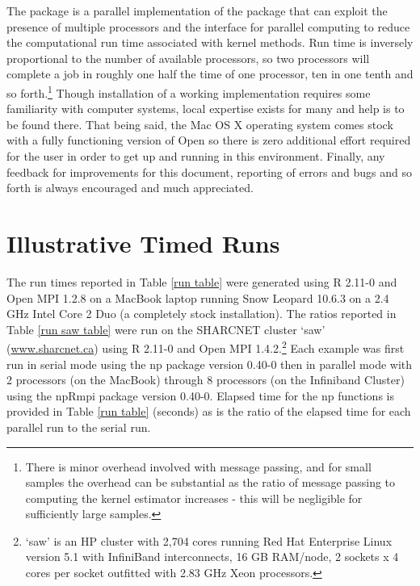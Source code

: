 \documentclass[nojss]{jss}
\begin{document}
The  package is a parallel implementation of the 
package that can exploit the presence of multiple processors and the
 interface for parallel computing to reduce the
computational run time associated with kernel methods. Run time is
inversely proportional to the number of available processors, so two
processors will complete a job in roughly one half the time of one
processor, ten in one tenth and so forth.\footnote{There is minor
  overhead involved with message passing, and for small samples the
  overhead can be substantial as the ratio of message passing to
  computing the kernel estimator increases - this will be negligible
  for sufficiently large samples.} Though installation of a working
 implementation requires some familiarity with computer
systems, local expertise exists for many and help is to be found
there. That being said, the Mac OS X operating system comes stock with
a fully functioning version of Open  so there is zero
additional effort required for the user in order to get up and running
in this environment. Finally, any feedback for improvements for this
document, reporting of errors and bugs and so forth is always
encouraged and much appreciated.



\appendix

\section{Illustrative Timed Runs}\label{sec run time}

The run times reported in Table \ref{run table} were generated using R
2.11-0 and Open MPI 1.2.8 on a MacBook laptop running Snow Leopard
10.6.3 on a 2.4 GHz Intel Core 2 Duo (a completely stock
installation). The ratios reported in Table \ref{run saw table} were
run on the SHARCNET cluster `saw' (\url{www.sharcnet.ca}) using R
2.11-0 and Open MPI 1.4.2.\footnote{`saw' is an HP cluster with 2,704
  cores running Red Hat Enterprise Linux version 5.1 with InfiniBand
  interconnects, 16 GB RAM/node, 2 sockets x 4 cores per socket
  outfitted with 2.83 GHz Xeon processors.}  Each example was first
run in serial mode using the np package version 0.40-0 then in
parallel mode with 2 processors (on the MacBook) through 8 processors
(on the Infiniband Cluster) using the npRmpi package version
0.40-0. Elapsed time for the np functions is provided in Table
\ref{run table} (seconds) as is the ratio of the elapsed time for each
parallel run to the serial run.
\end{document}

